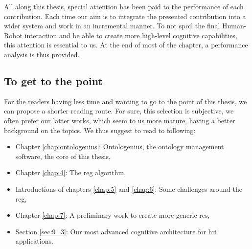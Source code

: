 All along this thesis, special attention has been paid to the performance of each contribution. Each time our aim is to integrate the presented contribution into a wider system and work in an incremental manner. To not spoil the final Human-Robot interaction and be able to create more high-level cognitive capabilities, this attention is essential to us. At the end of most of the chapter, a performance analysis is thus provided.

\subsection*{To get to the point}

For the readers having less time and wanting to go to the point of this thesis, we can propose a shorter reading route. For sure, this selection is subjective, we often prefer our latter works, which seem to us more mature, having a better background on the topics. We thus suggest to read to following:

\begin{itemize}
  \item Chapter \ref{chap:ontologenius}: Ontologenius, the ontology management software, the core of this thesis,
  \item Chapter \ref{chap:4}: The \acrlong{reg} algorithm,
  \item Introductions of chapters \ref{chap:5} and \ref{chap:6}: Some challenges around the \acrlong{reg},
  \item Chapter \ref{chap:7}: A preliminary work to create more generic \acrlong{re}s,
  \item Section \ref{sec:9_3}: Our most advanced cognitive architecture for \acrlong{hri} applications.
\end{itemize}
